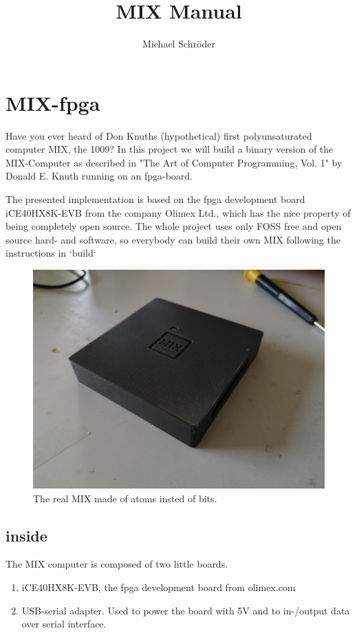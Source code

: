 \documentclass[a4paper,ngerman]{scrartcl}
\title{MIX Manual}
\author{Michael Schröder}
\begin{document}
\maketitle
\section{MIX-fpga}

Have you ever heard of Don Knuths (hypothetical) first polyunsaturated computer MIX, the 1009? In this project we will build a binary version of the MIX-Computer as described in "The Art of Computer Programming, Vol. 1" by Donald E. Knuth running on an fpga-board.

The presented implementation is based on the fpga development board iCE40HX8K-EVB from the company Olimex Ltd., which has the nice property of being completely open source. The whole project uses only FOSS free and open source hard- and software, so everybody can build their own MIX following the instructions in `build`
\begin{figure}[H]
	\centering
	\includegraphics[width=0.7\linewidth]{../MIX_toast.jpg}
	\caption{The real MIX made of atoms insted of bits.}
	\label{fig:mixtoast}
\end{figure}

\subsection{inside}

The MIX computer is composed of two little boards.
\begin{enumerate}
	\item iCE40HX8K-EVB, the fpga development board from olimex.com	
	\item  USB-serial adapter. Used to power the board with 5V and to in-/output data over serial interface.
\end{enumerate}
\end{document}
